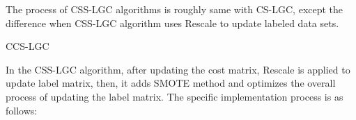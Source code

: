 \documentclass{svjour3}                     %
\begin{document}
 The process of CSS-LGC algorithms is roughly same with CS-LGC, except the difference when CSS-LGC
algorithm uses Rescale to update labeled data sets. 
\begin{algorithm}[h] 
  \begin{algorithmic}[1]
    \ENDWHILE
  \end{algorithmic}
  \caption{CCS-LGC}
  \label{algo:ccs-lgc}
\end{algorithm} 
In the CSS-LGC algorithm, after updating the cost matrix, Rescale is applied to update label matrix, then, it adds SMOTE method and optimizes the overall process of updating the label matrix. The
specific implementation process is as follows:
\end{document}
